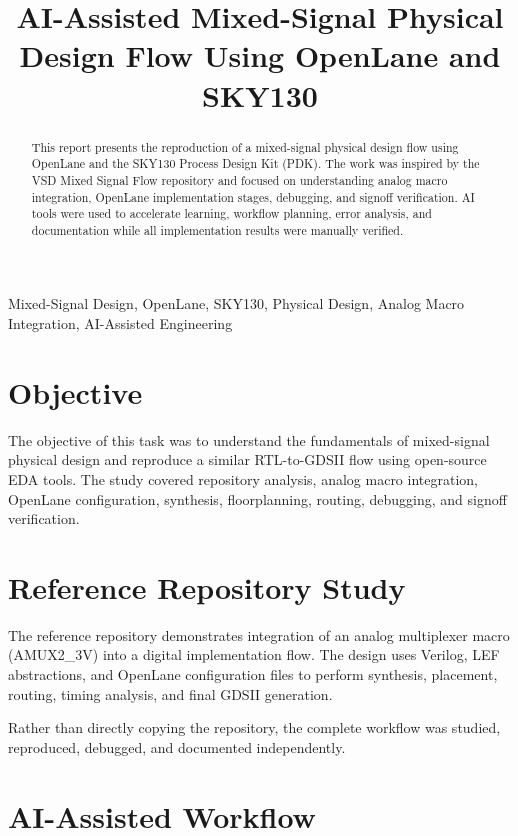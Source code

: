 \documentclass[conference]{IEEEtran}
\title{AI-Assisted Mixed-Signal Physical Design Flow Using OpenLane and SKY130}
\author{
\IEEEauthorblockN{Rishanya Shamganth}
\IEEEauthorblockA{
Electronics and Communication Engineering\
AI-Assisted Mixed Signal Physical Design Internship
}
}
\begin{document}
\maketitle

\begin{abstract}
This report presents the reproduction of a mixed-signal physical design flow using OpenLane and the SKY130 Process Design Kit (PDK). The work was inspired by the VSD Mixed Signal Flow repository and focused on understanding analog macro integration, OpenLane implementation stages, debugging, and signoff verification. AI tools were used to accelerate learning, workflow planning, error analysis, and documentation while all implementation results were manually verified.
\end{abstract}

\begin{IEEEkeywords}
Mixed-Signal Design, OpenLane, SKY130, Physical Design, Analog Macro Integration, AI-Assisted Engineering
\end{IEEEkeywords}

\section{Objective}

The objective of this task was to understand the fundamentals of mixed-signal physical design and reproduce a similar RTL-to-GDSII flow using open-source EDA tools. The study covered repository analysis, analog macro integration, OpenLane configuration, synthesis, floorplanning, routing, debugging, and signoff verification.

\section{Reference Repository Study}

The reference repository demonstrates integration of an analog multiplexer macro (AMUX2_3V) into a digital implementation flow. The design uses Verilog, LEF abstractions, and OpenLane configuration files to perform synthesis, placement, routing, timing analysis, and final GDSII generation.

Rather than directly copying the repository, the complete workflow was studied, reproduced, debugged, and documented independently.

\section{AI-Assisted Workflow}
\end{document}
